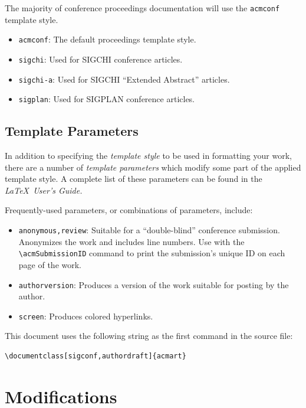\documentclass[sigconf, authordraft]{acmart}
\begin{document}
	The majority of conference proceedings documentation will use the
	{\verb|acmconf|} template style.
	\begin{itemize}
		\item {\verb|acmconf|}: The default proceedings template style.

		\item {\verb|sigchi|}: Used for SIGCHI conference articles.

		\item {\verb|sigchi-a|}: Used for SIGCHI ``Extended Abstract'' articles.

		\item {\verb|sigplan|}: Used for SIGPLAN conference articles.
	\end{itemize}

	\subsection{Template Parameters}


	In addition to specifying the {\itshape template style} to be used in
	formatting your work, there are a number of {\itshape template parameters} which
	modify some part of the applied template style. A complete list of these
	parameters can be found in the {\itshape \LaTeX\ User's Guide.}

	Frequently-used parameters, or combinations of parameters, include:
	\begin{itemize}
		\item {\verb|anonymous,review|}: Suitable for a ``double-blind'' conference
			submission. Anonymizes the work and includes line numbers. Use with the
			\verb|\acmSubmissionID| command to print the submission's unique ID on
			each page of the work.

		\item {\verb|authorversion|}: Produces a version of the work suitable for
			posting by the author.

		\item {\verb|screen|}: Produces colored hyperlinks.
	\end{itemize}

	This document uses the following string as the first command in the source file:
	\begin{verbatim}
\documentclass[sigconf,authordraft]{acmart}
\end{verbatim}

	\section{Modifications}
\end{document}
